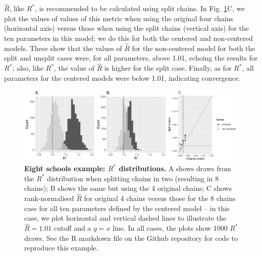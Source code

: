 \documentclass{article}
\begin{document}
$\widehat{R}$, like $R^*$, is recommended to be calculated using split chains. In Fig. \ref{fig:eight_schools}C, we plot the values of values of this metric when using the original four chains (horizontal axis) versus those when using the split chains (vertical axis) for the ten parameters in this model; we do this for both the centered and non-centered models. These show that the values of $\widehat{R}$ for the non-centered model for both the split and unsplit cases were, for all parameters, above 1.01, echoing the results for $R^*$; also, like $R^*$, the value of $\widehat{R}$ is higher for the split case. Finally, as for $R^*$, all parameters for the centered models were below 1.01, indicating convergence.

\begin{figure}[!htb]
	\centerline{\includegraphics[width=1.0\textwidth]{../output/eight_schools.pdf}}
	\caption{\textbf{Eight schools example: $R^*$ distributions.} A shows draws from the $R^*$ distribution when splitting chains in two (resulting in 8 chains); B shows the same but using the 4 original chains; C shows rank-normalised $\widehat{R}$ for original 4 chains versus those for the 8 chains case for all ten parameters defined by the centered model -- in this case, we plot horizontal and vertical dashed lines to illustrate the $\widehat{R}=1.01$ cutoff and a $y=x$ line. In all cases, the plots show 1000 $R^*$ draws. See the R markdown file on the Github repository for code to reproduce this example.}
	\label{fig:eight_schools}
\end{figure}
\end{document}
